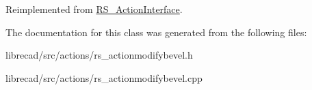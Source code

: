 Reimplemented from \hyperlink{classRS__ActionInterface_af1a8d898a8bf0521295d7c45d80e6d09}{R\-S\-\_\-\-Action\-Interface}.



The documentation for this class was generated from the following files\-:\begin{DoxyCompactItemize}
\item 
librecad/src/actions/rs\-\_\-actionmodifybevel.\-h\item 
librecad/src/actions/rs\-\_\-actionmodifybevel.\-cpp\end{DoxyCompactItemize}
